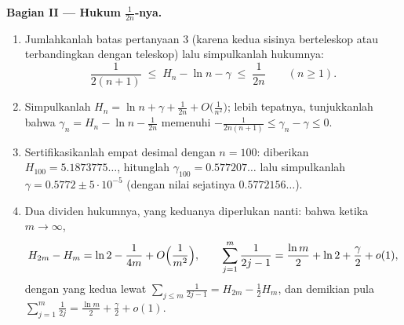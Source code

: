\begin{problem}[{Soal akhir pekan --- $H_n = \ln n + \gamma +
\frac{1}{2n} + O(n^{-2})$, dan menyusun ulang $1 - \frac12 +
\frac13 - \dots$ menjadi $\frac{\ln 2}{2}$}]
\medskip
\noindent\textbf{Bagian II --- Hukum $\frac{1}{2n}$-nya.}
\begin{enumerate}[resume]
  \item Jumlahkanlah batas pertanyaan 3 (karena kedua sisinya berteleskop atau
        terbandingkan dengan teleskop) lalu simpulkanlah hukumnya:
        \[
        \frac{1}{2(n+1)} \;\leq\; H_n - \ln n - \gamma \;\leq\;
        \frac{1}{2n} \qquad (n \geq 1).
        \]
  \item Simpulkanlah $H_n = \ln n + \gamma + \frac{1}{2n} +
        O\bigl(\frac{1}{n^2}\bigr)$; lebih tepatnya, tunjukkanlah bahwa
        $\gamma_n = H_n - \ln n - \frac{1}{2n}$ memenuhi
        $-\frac{1}{2n(n+1)} \leq \gamma_n - \gamma \leq 0$.
  \item Sertifikasikanlah empat desimal dengan $n = 100$: diberikan $H_{100} =
        5.1873775\dots$, hitunglah $\gamma_{100} = 0.577207\dots$
        lalu simpulkanlah $\gamma = 0.5772 \pm 5\cdot10^{-5}$ (dengan nilai
        sejatinya $0.5772156\dots$).
  \item Dua dividen hukumnya, yang keduanya diperlukan nanti: bahwa ketika $m \to
        \infty$,
        \[
        H_{2m} - H_m = \ln 2 - \frac{1}{4m} +
        O\Bigl(\frac{1}{m^2}\Bigr),
        \qquad
        \sum_{j=1}^{m} \frac{1}{2j-1} = \frac{\ln m}{2} + \ln 2
        + \frac\gamma2 + o(1) ,
        \]
        dengan yang kedua lewat $\sum_{j \leq m} \frac{1}{2j-1} = H_{2m}
        - \frac12 H_m$, dan demikian pula $\sum_{j=1}^{m}
        \frac{1}{2j} = \frac{\ln m}{2} + \frac\gamma2 + o(1)$.
\end{enumerate}


\end{problem}

